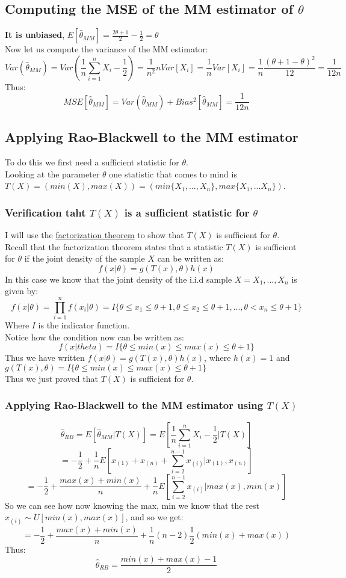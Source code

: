 \documentclass[12pt]{article}
\begin{document}
\subsection*{Computing the MSE of the MM estimator of $\theta$}
\textbf{It is unbiased}, $E[\hat{\theta}_{MM}] = \frac{2\theta+1}{2}-\frac{1}{2} = \theta$ \\ 
Now let us compute the variance of the MM estimator:
\[
Var(\hat{\theta}_{MM}) = Var(\frac{1}{n}\sum_{i=1}^{n}X_i - \frac{1}{2})  = \frac{1}{n^2}nVar[X_i] = \frac{1}{n}Var[X_i] = \frac{1}{n}\frac{(\theta+1-\theta)^2}{12} = \frac{1}{12n}
\]
Thus: 
\[
MSE[\hat{\theta}_{MM}] = Var(\hat{\theta}_{MM}) + Bias^2[\hat{\theta}_{MM}] = \frac{1}{12n}
\]
\subsection*{Applying Rao-Blackwell to the MM estimator}
To do this we first need a sufficient statistic for $\theta$. \\ Looking at the parameter $\theta$ one statistic that comes to mind is $T(X) = (min(X), max(X))= (min\{X_1,...,X_n\} ,max\{X_1,...X_n\})$. 
\subsubsection*{Verification taht $T(X)$ is a sufficient statistic for $\theta$}
I will use the \underline{factorization theorem} to show that $T(X)$ is sufficient for $\theta$.\\
Recall that the factorization theorem states that a statistic $T(X)$ is sufficient for $\theta$ if the joint density of the sample $X$ can be written as:
\[
f(x|\theta) = g(T(x),\theta)h(x)
\]
In this case we know that the joint density of the i.i.d sample $X = X_1,...,X_n$ is given by:
\[
f(x|\theta) = \prod_{i=1}^{n} f(x_i|\theta) = I\{\theta\leq x_1\leq \theta+1, \theta\leq x_2\leq\theta+1, ..., \theta<x_n\leq \theta+1\}  
\]
Where $I$ is the indicator function.\\
Notice how the condition now can be written as: 
\[
f(x|theta) = I\{\theta  \leq min(x) \leq max(x) \leq \theta+1\}
\]
Thus we have written $f(x|\theta) = g(T(x),\theta)h(x)$, where $h(x)=1$ and $g(T(x),\theta) = I\{\theta  \leq min(x) \leq max(x) \leq \theta+1\}$\\
Thus we just proved that $T(X)$ is sufficient for $\theta$.
\subsubsection*{Applying Rao-Blackwell to the MM estimator using $T(X)$}
\[
\hat{\theta}_{RB} = E[\hat{\theta}_{MM}|T(X)] = E[\frac{1}{n}\sum_{i=1}^{n}X_i - \frac{1}{2}|T(X)]
\]
\[
= -\frac{1}{2} +\frac{1}{n}E[x_{(1)}+x_{(n)} + \sum_{i=2}^{n-1}x_{(i)}|x_{(1)},x_{(n)}]
\]
\[
= - \frac{1}{2} + \frac{max(x)+min(x)}{n} + \frac{1}{n}E[\sum_{i=2}^{n-1}x_{(i)}|max(x),min(x)]
\]
So we can see how now knowing the max, min we know that the rest $x_{(i)} \sim U[min(x),max(x)]$, and so we get: 
\[
= - \frac{1}{2} + \frac{max(x)+min(x)}{n} + \frac{1}{n}(n-2)\frac{1}{2}(min(x)+max(x))
\]
Thus: 
\[
\hat{\theta}_{RB} = \frac{min(x)+max(x)-1}{2}
\]
\end{document}
